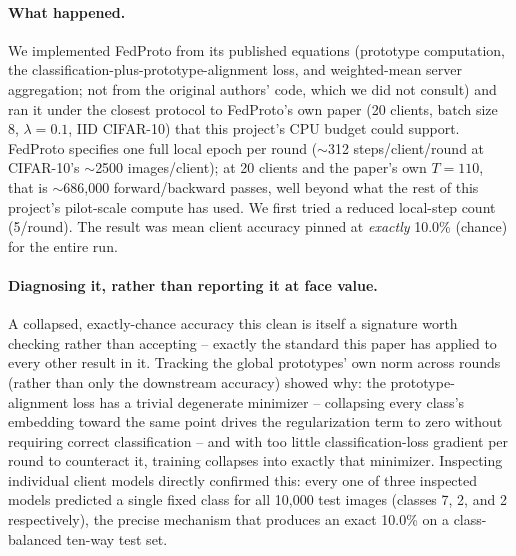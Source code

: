 \documentclass{article}
\begin{document}
\paragraph{What happened.} We implemented FedProto from its published equations
(prototype computation, the classification-plus-prototype-alignment loss, and
weighted-mean server aggregation; not from the original authors' code, which we
did not consult) and ran it under the closest protocol to FedProto's own paper
(20 clients, batch size 8, $\lambda{=}0.1$, IID CIFAR-10) that this project's CPU
budget could support. FedProto specifies one full local epoch per round
($\sim$312 steps/client/round at CIFAR-10's $\sim$2500 images/client); at 20
clients and the paper's own $T{=}110$, that is $\sim$686{,}000 forward/backward
passes, well beyond what the rest of this project's pilot-scale compute has
used. We first tried a reduced local-step count (5/round). The result was mean
client accuracy pinned at \emph{exactly} 10.0\% (chance) for the entire run.

\paragraph{Diagnosing it, rather than reporting it at face value.} A collapsed,
exactly-chance accuracy this clean is itself a signature worth checking rather
than accepting -- exactly the standard this paper has applied to every other
result in it. Tracking the global prototypes' own norm across rounds (rather
than only the downstream accuracy) showed why: the prototype-alignment loss has
a trivial degenerate minimizer -- collapsing every class's embedding toward the
same point drives the regularization term to zero without requiring correct
classification -- and with too little classification-loss gradient per round to
counteract it, training collapses into exactly that minimizer. Inspecting
individual client models directly confirmed this: every one of three inspected
models predicted a single fixed class for all 10{,}000 test images (classes 7,
2, and 2 respectively), the precise mechanism that produces an exact 10.0\%
on a class-balanced ten-way test set.
\end{document}

